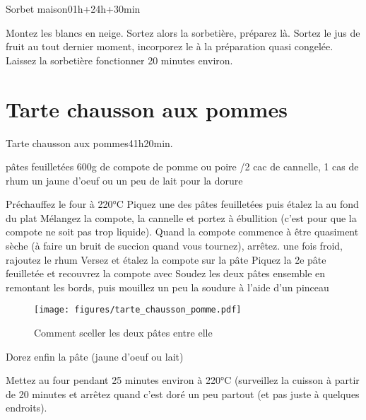 {\begin{recette}{Sorbet maison}{0}{1h+24h+30min}{}
\begin{preparation}
\etape Montez les blancs en neige.
\etape Sortez alors la sorbetière, préparez là.
\etape Sortez le jus de fruit au tout dernier moment, incorporez le à la préparation quasi congelée.
\etape Laissez la sorbetière fonctionner 20 minutes environ.
\end{preparation}
\end{recette}

\section{Tarte chausson aux pommes}
\begin{recette}{Tarte chausson aux pommes}{4}{1h}{20min.}
\begin{ingredients}
 pâtes feuilletées
\ingredient 600g de compote de pomme ou poire
/2 cac de cannelle, 1 cas de rhum
\ingredient un jaune d'oeuf ou un peu de lait pour la dorure
\end{ingredients}

\begin{preparation}
\etape Préchauffez le four à 220°C
\etape Piquez une des pâtes feuilletées puis étalez la au fond du plat
\etape Mélangez la compote, la cannelle et portez à ébullition (c'est pour que la compote ne soit pas trop liquide). Quand la compote commence à être quasiment sèche (à faire un bruit de succion quand vous tournez), arrêtez.
\etape une fois froid, rajoutez le rhum
\etape Versez et étalez la compote sur la pâte 
\etape Piquez la 2e pâte feuilletée et recouvrez la compote avec
\etape Soudez les deux pâtes ensemble en remontant les bords, puis mouillez un peu la soudure à l'aide d'un pinceau
\begin{figure}[htb]
\centering
\texttt{[image: figures/tarte\_chausson\_pomme.pdf]}
\caption{Comment sceller les deux pâtes entre elle}
\end{figure}
\etape Dorez enfin la pâte (jaune d'oeuf ou lait)
\end{preparation}



\begin{cuisson}
Mettez au four pendant 25 minutes environ à 220°C (surveillez la cuisson à partir de 20 minutes et arrêtez quand c'est doré un peu partout (et pas juste à quelques endroits).
\end{cuisson}
\end{recette}

}
